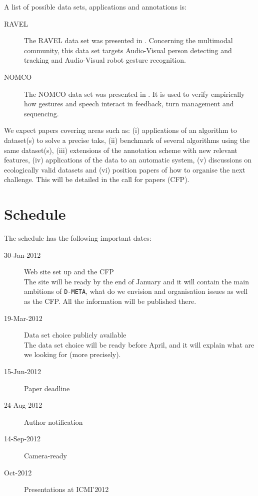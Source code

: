 \documentclass{sig-alternate}
\begin{document}
A list of possible data sets, applications and annotations is:
\begin{description}
 \item [RAVEL] The RAVEL data set was presented in \cite{Ravel}. Concerning the multimodal community, this data set
targets Audio-Visual person detecting and tracking and Audio-Visual robot gesture recognition.
 \item [NOMCO] The NOMCO data set was presented in \cite{Paggio10}. It is used to verify empirically
how gestures and speech interact in feedback, turn management and sequencing.
\end{description}

We expect papers covering areas such as: (i) applications of an algorithm to dataset(s) to solve a precise taks, (ii)
benchmark of several algorithms using the same dataset(s), (iii) extensions of the annotation scheme with new relevant
features, (iv) applications of the data to an automatic system, (v) discussions on ecologically valid datasets and (vi)
position papers of how to organise the next challenge. This will be detailed in the call for papers (CFP).

\section{Schedule}
The schedule has the following important dates:
\begin{description}
 \item[30-Jan-2012] Web site set up and the CFP\\
 The site will be ready by the end of January and it will contain the main ambitions of \texttt{D-META}, what do we
envision and organisation issues as well as the CFP. All the information will be published there.
 \item[19-Mar-2012] Data set choice publicly available\\
 The data set choice will be ready before April, and it will explain what are we looking for (more precisely).
 \item[15-Jun-2012] Paper deadline
 \item[24-Aug-2012] Author notification
 \item[14-Sep-2012] Camera-ready
 \item[Oct-2012] Presentations at ICMI'2012
\end{description}
\end{document}
